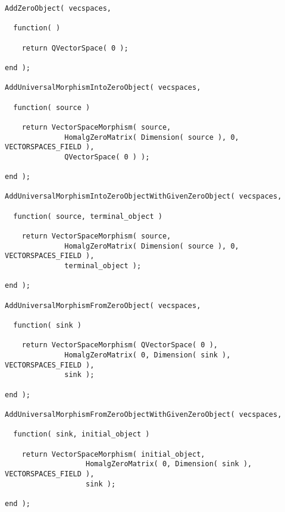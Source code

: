 \begin{small}
\begin{Verbatim}[frame=single]
AddZeroObject( vecspaces,

  function( )

    return QVectorSpace( 0 );

end );

AddUniversalMorphismIntoZeroObject( vecspaces,

  function( source )

    return VectorSpaceMorphism( source,
              HomalgZeroMatrix( Dimension( source ), 0, VECTORSPACES_FIELD ),
              QVectorSpace( 0 ) );
    
end );

AddUniversalMorphismIntoZeroObjectWithGivenZeroObject( vecspaces,

  function( source, terminal_object )

    return VectorSpaceMorphism( source,
              HomalgZeroMatrix( Dimension( source ), 0, VECTORSPACES_FIELD ),
              terminal_object );
    
end );

AddUniversalMorphismFromZeroObject( vecspaces,

  function( sink )
    
    return VectorSpaceMorphism( QVectorSpace( 0 ),
              HomalgZeroMatrix( 0, Dimension( sink ), VECTORSPACES_FIELD ),
              sink );
    
end );

AddUniversalMorphismFromZeroObjectWithGivenZeroObject( vecspaces,

  function( sink, initial_object )
    
    return VectorSpaceMorphism( initial_object,
                   HomalgZeroMatrix( 0, Dimension( sink ), VECTORSPACES_FIELD ),
                   sink );
    
end );
\end{Verbatim}
\end{small}
